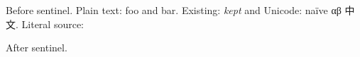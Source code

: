 \documentclass{article}
\begin{document}
Before sentinel.
Plain text: foo and bar.
Existing: \emph{kept} and Unicode: naïve αβ 中文.
Literal source:  %

After sentinel.
\end{document}
